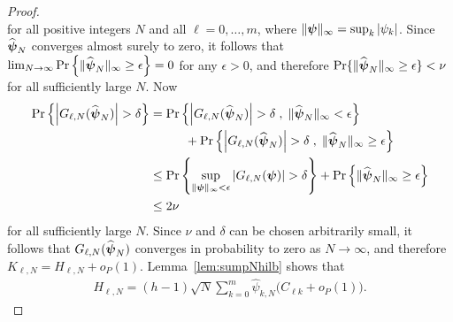 \documentclass[aap]{imsart}
\newcommand{\prob}{\operatorname{Pr}}
\newcommand{\abs}[1]{\left\vert #1 \right\vert}
\begin{document}
\begin{proof}
\[\]
for all positive integers $N$ and all $\ell = 0,\dots,m$, where $\|\psibf\|_\infty = \sup_{k} \abs{\psi_k}$.  Since $\widehat{\boldsymbol{\psi}}_N$ converges almost surely to zero, it follows that $\lim_{N\rightarrow\infty}\prob\left\{ \|\widehat{\psibf}_N\|_{\infty} \geq \epsilon \right\} = 0$ for any $\epsilon > 0$, and therefore $\prob\{ \|\widehat{\psibf}_N\|_{\infty} \geq \epsilon \} < \nu$ for all sufficiently large $N$.  Now
\begin{align*}
  \prob\left\{\abs{ G_{\ell,N}(\widehat{\psibf}_N) } > \delta \right\} &= \prob\left\{ \abs{G_{\ell,N}(\widehat{\psibf}_N)} > \delta \;, \; \|\widehat{\psibf}_N\|_{\infty} < \epsilon \right\} \\
&\hspace{1cm} + \prob\left\{ \abs{G_{\ell,N}(\widehat{\psibf}_N)} > \delta  \;, \; \|\widehat{\psibf}_N\|_{\infty} \geq \epsilon \right\} \\
&\leq \prob\left\{  \sup_{\|\psibf\|_{\infty} < \epsilon} \abs{ G_{\ell,N}(\psibf) } > \delta \right\} + \prob\left\{ \|\widehat{\psibf}_N\|_{\infty} \geq \epsilon \right\} \\
&\leq 2\nu
\end{align*}
for all sufficiently large $N$.  Since $\nu$ and $\delta$ can be chosen arbitrarily small, it follows that $G_{\ell,N}(\widehat{\boldsymbol{\psi}}_N)$ converges in probability to zero as $N\rightarrow\infty$, and therefore $K_{\ell,N} = H_{\ell,N} + o_P(1)$.  Lemma~\ref{lem:sumpNhilb} shows that
\begin{align*}
H_{\ell,N} =  (h-1)\sqrt{N} \sum_{k=0}^{m}  \widehat{\psi}_{k,N} \big(C_{\ell k} + o_P(1)\big).
\end{align*}
\end{proof}
\end{document}
